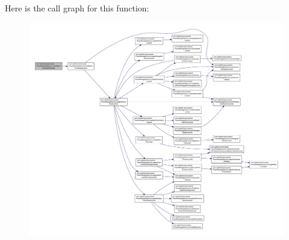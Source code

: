 Here is the call graph for this function\-:
\nopagebreak
\begin{figure}[H]
\begin{center}
\leavevmode
\includegraphics[width=350pt]{classcom_1_1android_1_1server_1_1power_1_1PowerManagerService_a6e6bee2d07f48c66f5eddb6247bce35a_cgraph}
\end{center}
\end{figure}



